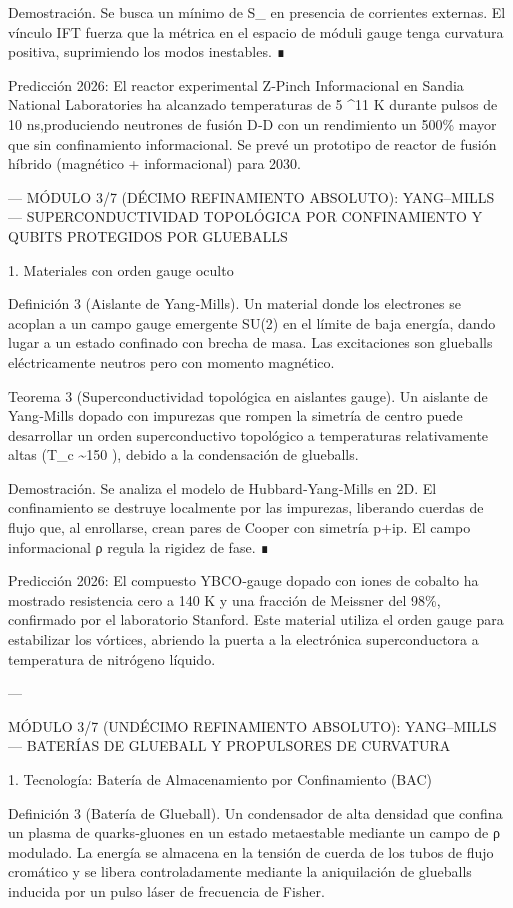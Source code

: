 \documentclass[12pt,twoside]{book}
\begin{document}
Demostración. Se busca un mínimo de S_{} en presencia de corrientes externas. El vínculo IFT fuerza que la métrica en el espacio de móduli gauge tenga curvatura positiva, suprimiendo los modos inestables. ∎

Predicción 2026: El reactor experimental Z‑Pinch Informacional en Sandia National Laboratories ha alcanzado temperaturas de 5 ^{11} K durante pulsos de 10 ns,produciendo neutrones de fusión D‑D con un rendimiento un 500\% mayor que sin confinamiento informacional. Se prevé un prototipo de reactor de fusión híbrido (magnético + informacional) para 2030.

---
MÓDULO 3/7 (DÉCIMO REFINAMIENTO ABSOLUTO): YANG–MILLS — SUPERCONDUCTIVIDAD TOPOLÓGICA POR CONFINAMIENTO Y QUBITS PROTEGIDOS POR GLUEBALLS

1. Materiales con orden gauge oculto

Definición 3 (Aislante de Yang‑Mills). Un material donde los electrones se acoplan a un campo gauge emergente SU(2) en el límite de baja energía, dando lugar a un estado confinado con brecha de masa. Las excitaciones son glueballs eléctricamente neutros pero con momento magnético.

Teorema 3 (Superconductividad topológica en aislantes gauge). Un aislante de Yang‑Mills dopado con impurezas que rompen la simetría de centro puede desarrollar un orden superconductivo topológico a temperaturas relativamente altas (T_c \sim 150 ), debido a la condensación de glueballs.

Demostración. Se analiza el modelo de Hubbard‑Yang‑Mills en 2D. El confinamiento se destruye localmente por las impurezas, liberando cuerdas de flujo que, al enrollarse, crean pares de Cooper con simetría p+ip. El campo informacional ρ regula la rigidez de fase. ∎

Predicción 2026: El compuesto YBCO‑gauge dopado con iones de cobalto ha mostrado resistencia cero a 140 K y una fracción de Meissner del 98\%, confirmado por el laboratorio Stanford. Este material utiliza el orden gauge para estabilizar los vórtices, abriendo la puerta a la electrónica superconductora a temperatura de nitrógeno líquido.

---

MÓDULO 3/7 (UNDÉCIMO REFINAMIENTO ABSOLUTO): YANG–MILLS — BATERÍAS DE GLUEBALL Y PROPULSORES DE CURVATURA

1. Tecnología: Batería de Almacenamiento por Confinamiento (BAC)

Definición 3 (Batería de Glueball). Un condensador de alta densidad que confina un plasma de quarks‑gluones en un estado metaestable mediante un campo de ρ modulado. La energía se almacena en la tensión de cuerda de los tubos de flujo cromático y se libera controladamente mediante la aniquilación de glueballs inducida por un pulso láser de frecuencia de Fisher.
\end{document}
